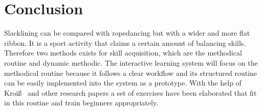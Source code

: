 \section{Conclusion}
 Slacklining can be compared with ropedancing but with a wider and more flat ribbon. It is a sport activity that claims a certain amount of balancing skills. Therefore two methods exists for skill acquisition, which are the methodical routine and dynamic methodic. The interactive learning system will focus on the methodical routine because it follows a clear workflow and its structured routine can be easily implemented into the system as a prototype. With the help of Kroiß~\cite{Kroiss2007-ab} and other research papers a set of exercises have been elaborated that fit in this routine and train beginners appropriately.
